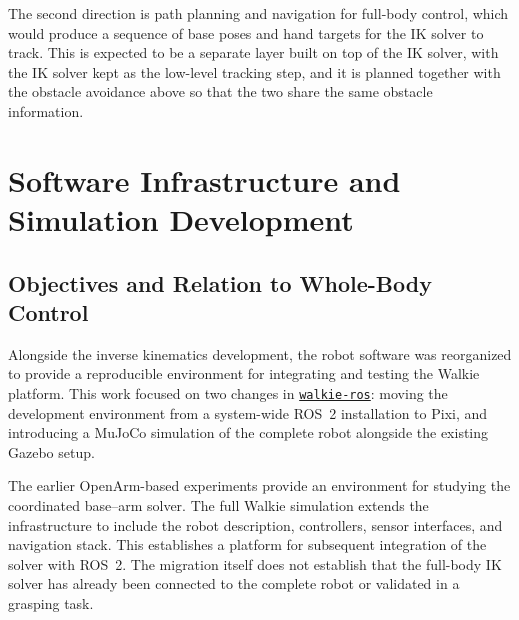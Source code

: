 \documentclass[12pt,a4paper]{article}
\begin{document}
The second direction is path planning and navigation for full-body control, which would produce a sequence of base poses and hand targets for the IK solver to track. This is expected to be a separate layer built on top of the IK solver, with the IK solver kept as the low-level tracking step, and it is planned together with the obstacle avoidance above so that the two share the same obstacle information.


\clearpage

\providecommand{\migrationplaceholder}[2]{%
  \fbox{\begin{minipage}[c][#1][c]{0.88\linewidth}
    \centering\small\textit{#2}
  \end{minipage}}%
}

\section*{Software Infrastructure and Simulation Development}

\subsection*{Objectives and Relation to Whole-Body Control}

Alongside the inverse kinematics development, the robot software was
reorganized to provide a reproducible environment for integrating and
testing the Walkie platform. This work focused on two changes in
\textcolor{blue}{\href{https://github.com/EIC-Robocup-2026/walkie-ros}{\texttt{walkie-ros}}}: moving the development environment from a system-wide
ROS~2 installation to Pixi, and introducing a MuJoCo simulation of the
complete robot alongside the existing Gazebo setup.

The earlier OpenArm-based experiments provide an environment for studying
the coordinated base--arm solver. The full Walkie simulation extends the
infrastructure to include the robot description, controllers, sensor
interfaces, and navigation stack. This establishes a platform for
subsequent integration of the solver with ROS~2. The migration itself
does not establish that the full-body IK solver has already been connected
to the complete robot or validated in a grasping task.
\end{document}
